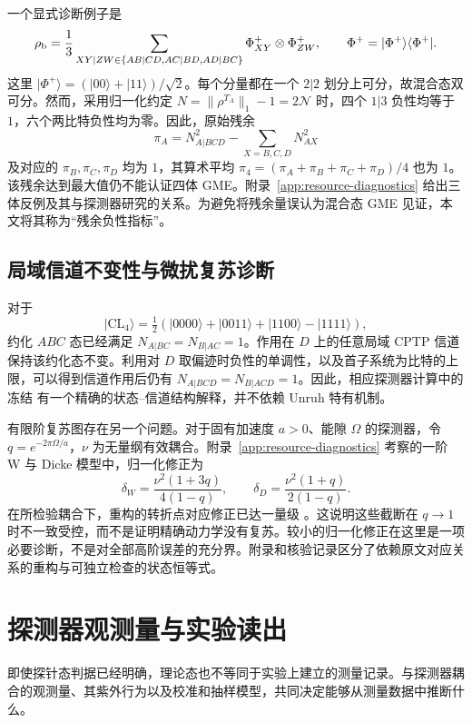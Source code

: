 \documentclass[UTF8,11pt,a4paper,fontset=none]{ctexart}
\begin{document}
一个显式诊断例子是
\begin{equation}
\rho_{\rm b}=\frac13\sum_{XY|ZW\in\{AB|CD,AC|BD,AD|BC\}}
\Phi^+_{XY}\otimes\Phi^+_{ZW},\qquad
\Phi^+=|\Phi^+\rangle\langle\Phi^+|.
\label{eq:main-gme-counterexample}
\end{equation}
这里 $|\Phi^+\rangle=(|00\rangle+|11\rangle)/\sqrt2$。每个分量都在一个 $2|2$ 划分上可分，故混合态双可分。然而，采用归一化约定 $N=\|\rho^{T_A}\|_1-1=2\mathcal N$ 时，四个 $1|3$ 负性均等于 $1$，六个两比特负性均为零。因此，原始残余
\begin{equation}
\pi_A=N_{A|BCD}^2-\sum_{X=B,C,D}N_{AX}^2
\end{equation}
及对应的 $\pi_B,\pi_C,\pi_D$ 均为 $1$，其算术平均 $\pi_4=(\pi_A+\pi_B+\pi_C+\pi_D)/4$ 也为 $1$。该残余达到最大值仍不能认证四体 GME。附录~\ref{app:resource-diagnostics} 给出三体反例及其与探测器研究的关系。为避免将残余量误认为混合态 GME 见证，本文将其称为“残余负性指标”。

\subsection{局域信道不变性与微扰复苏诊断}
对于
\begin{equation}
|\mathrm{CL}_4\rangle=\tfrac12(|0000\rangle+|0011\rangle+|1100\rangle-|1111\rangle),
\end{equation}
约化 $ABC$ 态已经满足 $N_{A|BC}=N_{B|AC}=1$。作用在 $D$ 上的任意局域 CPTP 信道保持该约化态不变。利用对 $D$ 取偏迹时负性的单调性，以及首子系统为比特的上限，可以得到信道作用后仍有 $N_{A|BCD}=N_{B|ACD}=1$。因此，相应探测器计算中的冻结 \cite{LiCluster2026} 有一个精确的状态--信道结构解释，并不依赖 Unruh 特有机制。

有限阶复苏图存在另一个问题。对于固有加速度 $a>0$、能隙 $\Omega$ 的探测器，令 $q=e^{-2\pi\Omega/a}$，$\nu$ 为无量纲有效耦合。附录~\ref{app:resource-diagnostics} 考察的一阶 W 与 Dicke 模型中，归一化修正为
\begin{equation}
\delta_W=\frac{\nu^2(1+3q)}{4(1-q)},\qquad
\delta_D=\frac{\nu^2(1+q)}{2(1-q)}.
\end{equation}
在所检验耦合下，重构的转折点对应修正已达一量级 \cite{LiWState2025,WuDicke2026}。这说明这些截断在 $q\to1$ 时不一致受控，而不是证明精确动力学没有复苏。较小的归一化修正在这里是一项必要诊断，不是对全部高阶误差的充分界。附录和核验记录区分了依赖原文对应关系的重构与可独立检查的状态恒等式。

\section{探测器观测量与实验读出}
\label{sec:readout}
\label{sec:curved}
\label{sec:experiment}
即使探针态判据已经明确，理论态也不等同于实验上建立的测量记录。与探测器耦合的观测量、其紫外行为以及校准和抽样模型，共同决定能够从测量数据中推断什么。
\end{document}
